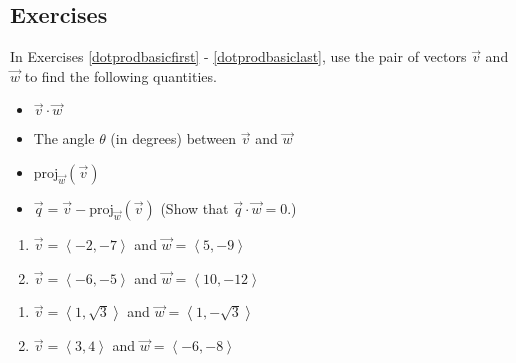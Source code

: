 \subsection{Exercises}

In Exercises \ref{dotprodbasicfirst} - \ref{dotprodbasiclast}, use the pair of vectors $\vec{v}$ and $\vec{w}$ to find the following quantities.

\begin{multicols}{2} \raggedcolumns

\begin{itemize}

\item $\vec{v} \cdot \vec{w}$
\item The angle $\theta$ (in degrees) between $\vec{v}$ and $\vec{w}$ 
\item $\text{proj}_{\vec{w}}(\vec{v})$
\item $\vec{q} = \vec{v} - \text{proj}_{\vec{w}}(\vec{v})$ (Show that $\vec{q} \cdot \vec{w} = 0$.)

\end{itemize}

\end{multicols}

\begin{multicols}{2} 

\begin{enumerate}

\item $\vec{v} = \left\langle -2, -7 \right\rangle$ and $\vec{w} = \left\langle 5, -9 \right\rangle$ \label{dotprodbasicfirst}
\item $\vec{v} = \left\langle -6, -5 \right\rangle$ and $\vec{w} = \left\langle 10, -12 \right\rangle$

\setcounter{HW}{\value{enumi}}

\end{enumerate}

\end{multicols}

\begin{multicols}{2} 

\begin{enumerate}

\setcounter{enumi}{\value{HW}}

\item $\vec{v} = \left\langle 1, \sqrt{3} \right\rangle$ and $\vec{w} = \left\langle 1, -\sqrt{3} \right\rangle$
\item $\vec{v} = \left\langle  3, 4 \right\rangle$ and $\vec{w} = \left\langle -6, -8 \right\rangle$

\setcounter{HW}{\value{enumi}}

\end{enumerate}

\end{multicols}

